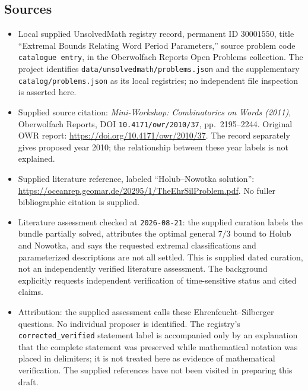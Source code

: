 \documentclass[11pt]{article}
\begin{document}
\subsection{Sources}
\begin{itemize}
\item Local supplied UnsolvedMath registry record, permanent ID \(30001550\), title ``Extremal Bounds Relating Word Period Parameters,'' source problem code \texttt{catalogue entry}, in the Oberwolfach Reports Open Problems collection. The project identifies \texttt{data/unsolvedmath/problems.json} and the supplementary \texttt{catalog/problems.json} as its local registries; no independent file inspection is asserted here.
\item Supplied source citation: \emph{Mini-Workshop: Combinatorics on Words (2011)}, Oberwolfach Reports, DOI \texttt{10.4171/owr/2010/37}, pp.\ 2195--2244. Original OWR report: \url{https://doi.org/10.4171/owr/2010/37}. The record separately gives proposed year 2010; the relationship between these year labels is not explained.
\item Supplied literature reference, labeled ``Holub--Nowotka solution'': \url{https://oceanrep.geomar.de/20295/1/TheEhrSilProblem.pdf}. No fuller bibliographic citation is supplied.
\item Literature assessment checked at \texttt{2026-08-21}: the supplied curation labels the bundle partially solved, attributes the optimal general \(7/3\) bound to Holub and Nowotka, and says the requested extremal classifications and parameterized descriptions are not all settled. This is supplied dated curation, not an independently verified literature assessment. The background explicitly requests independent verification of time-sensitive status and cited claims.
\item Attribution: the supplied assessment calls these Ehrenfeucht--Silberger questions. No individual proposer is identified. The registry's \texttt{corrected\_verified} statement label is accompanied only by an explanation that the complete statement was preserved while mathematical notation was placed in delimiters; it is not treated here as evidence of mathematical verification. The supplied references have not been visited in preparing this draft.
\end{itemize}
\end{document}
